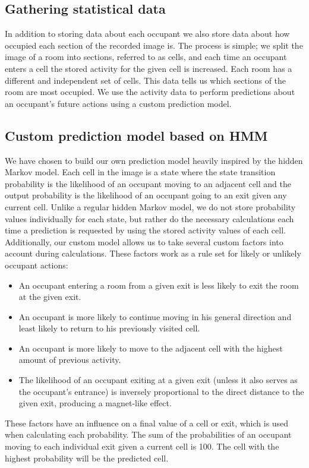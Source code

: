 
\subsection{Gathering statistical data}
\label{ssub:statisticaldata}
In addition to storing data about each occupant we also store data about how occupied each section of the recorded image is. The process is simple; we split the image of a room into sections, referred to as cells, and each time an occupant enters a cell the stored activity for the given cell is increased. Each room has a different and independent set of cells. This data tells us which sections of the room are most occupied. We use the activity data to perform predictions about an occupant's future actions using a custom prediction model.

\subsection{Custom prediction model based on HMM}
\label{ssub:designcustomprediction}
We have chosen to build our own prediction model heavily inspired by the hidden Markov model. Each cell in the image is a state where the state transition probability is the likelihood of an occupant moving to an adjacent cell and the output probability is the likelihood of an occupant going to an exit given any current cell. Unlike a regular hidden Markov model, we do not store probability values individually for each state, but rather do the necessary calculations each time a prediction is requested by using the stored activity values of each cell. Additionally, our custom model allows us to take several custom factors into account during calculations. These factors work as a rule set for likely or unlikely occupant actions:

\begin{itemize}
	\item An occupant entering a room from a given exit is less likely to exit the room at the given exit.
	\item An occupant is more likely to continue moving in his general direction and least likely to return to his previously visited cell.
	\item An occupant is more likely to move to the adjacent cell with the highest amount of previous activity.
	\item The likelihood of an occupant exiting at a given exit (unless it also serves as the occupant's entrance) is inversely proportional to the direct distance to the given exit, producing a magnet-like effect. 
\end{itemize}
These factors have an influence on a final value of a cell or exit, which is used when calculating each probability. The sum of the probabilities of an occupant moving to each individual exit given a current cell is 100. The cell with the highest probability will be the predicted cell.

